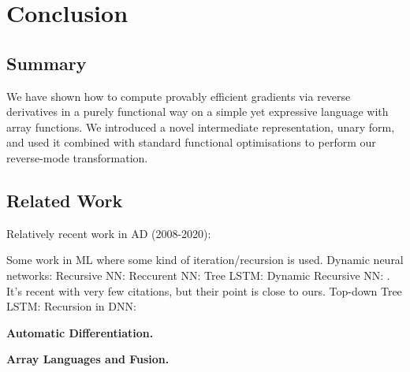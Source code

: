 \section{Conclusion}
\label{sec:conclusion}

\subsection{Summary} %
\label{sub:summary}

We have shown how to compute provably efficient gradients via reverse derivatives in a purely functional way 
on a simple yet expressive language with array functions.
We introduced a novel intermediate representation, unary form, 
and used it combined with standard functional optimisations to perform our reverse-mode transformation.

\subsection{Related Work} %
\label{sub:related_work}

Relatively recent work in AD (2008-2020):
\cite{mak2020differential,elliotthigher,vytiniotis2019differentiable,innes2018don,baydin2017automatic,huot2020correctness,gallagher-sdg,manzyuk2012confusion,wang2018demystifying,beck1994if,wang2018backpropagation,betancourt2018geometric,elliott2018simple,carpenter2015stan,paszke2017automatic,shaikhha2019efficient,innes2019zygote,griewank2008evaluating,kucukelbir2017automatic,brunel2019backpropagation,barthe2020versatility,abadi2019simple,cockett2019reverse,van2018automatic,hascoet2013tapenade,abadi2016tensorflow,pearlmutter2008reverse,bergstra2010theano,fong2019backprop,ehrhard2003differential,agrawal2019tensorflow,bettencourt2019taylor,cruttwell2017cartesian,manzyuk2012simply,laue2018computing,bernstein2020differentiating}

Some work in ML where some kind of iteration/recursion is used.
Dynamic neural networks: \cite{jin2017manipulability,wu2016deep}
Recursive NN: \cite{socher2011parsing,biancofiore2017recursive}
Reccurent NN: \cite{bahdanau2014neural,luong2015effective}
Tree LSTM: \cite{tai2015improved,chen2016enhanced}
Dynamic Recursive NN: \cite{guo2019dynamic}. It's recent with very few citations, but their point is close to ours. 
Top-down Tree LSTM: \cite{zhang2015top}
Recursion in DNN: \cite{jeong2018improving}

\noindent \textbf{Automatic Differentiation.} 

\noindent \textbf{Array Languages and Fusion.}

